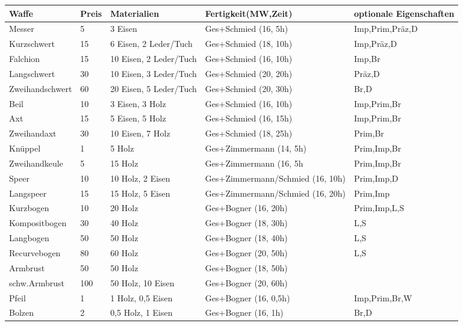 \documentclass{article}
\begin{document}
\begin{small}
\begin{tabular}{|m{25mm}|m{1cm}|m{40mm}|m{40mm}|m{30mm}|}
\hline
\textbf{Waffe}&\textbf{Preis}&\textbf{Materialien}&\textbf{Fertigkeit(MW,Zeit)}&\textbf{optionale Eigenschaften}\\
\hline
\hline
Messer&5&3 Eisen&Ges+Schmied (16, 5h)&Imp,Prim,Präz,D\\
\hline
Kurzschwert&15&6 Eisen, 2 Leder/Tuch&Ges+Schmied (18, 10h)&Imp,Präz,D\\
\hline
Falchion&15&10 Eisen, 2 Leder/Tuch&Ges+Schmied (16, 10h)&Imp,Br\\
\hline
Langschwert&30&10 Eisen, 3 Leder/Tuch&Ges+Schmied (20, 20h)&Präz,D\\
\hline
Zweihandschwert&60&20 Eisen, 5 Leder/Tuch&Ges+Schmied (20, 30h)&Br,D\\
\hline
Beil&10&3 Eisen, 3 Holz&Ges+Schmied (16, 10h)&Imp,Prim,Br\\
\hline
Axt&15&5 Eisen, 5 Holz&Ges+Schmied (16, 15h)&Imp,Prim,Br\\
\hline
Zweihandaxt&30&10 Eisen, 7 Holz&Ges+Schmied (18, 25h)&Prim,Br\\
\hline
Knüppel&1&5 Holz&Ges+Zimmermann (14, 5h)&Prim,Imp,Br\\
\hline
Zweihandkeule&5&15 Holz&Ges+Zimmermann (16, 5h&Prim,Imp,Br\\
\hline
Speer&10&10 Holz, 2 Eisen&Ges+Zimmermann/Schmied (16, 10h)&Prim,Imp,D\\
\hline
Langspeer&15&15 Holz, 5 Eisen&Ges+Zimmermann/Schmied (16, 20h)&Prim,Imp\\
\hline
Kurzbogen&10&20 Holz&Ges+Bogner (16, 20h)&Prim,Imp,L,S\\
\hline
Kompositbogen&30&40 Holz&Ges+Bogner (18, 30h)&L,S\\
\hline
Langbogen&50&50 Holz&Ges+Bogner (18, 40h)&L,S\\
\hline
Recurvebogen&80&60 Holz&Ges+Bogner (20, 50h)&L,S\\
\hline
Armbrust&50&50 Holz&Ges+Bogner (18, 50h)&\\
\hline
schw.Armbrust&100&50 Holz, 10 Eisen&Ges+Bogner (20, 60h)&\\
\hline
Pfeil&1&1 Holz, 0,5 Eisen&Ges+Bogner (16, 0,5h)&Imp,Prim,Br,W\\
\hline
Bolzen&2&0,5 Holz, 1 Eisen&Ges+Bogner (16, 1h)&Br,D\\
\hline
\end{tabular}
\end{small}
\end{document}
